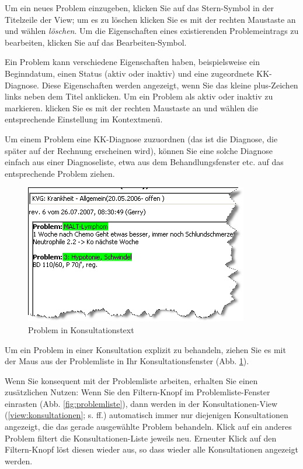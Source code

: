 Um ein neues Problem einzugeben, klicken Sie auf das Stern-Symbol in der Titelzeile der View; um es zu löschen klicken Sie es mit der rechten Maustaste an und wählen \textit{löschen}. Um die Eigenschaften eines existierenden Problemeintrags zu bearbeiten, klicken Sie auf das Bearbeiten-Symbol.

Ein Problem kann verschiedene Eigenschaften haben, beispielsweise ein Beginndatum, einen Status (aktiv oder inaktiv) und eine zugeordnete KK-Diagnose. Diese Eigenschaften werden angezeigt, wenn Sie das kleine plus-Zeichen links neben dem Titel anklicken. Um ein Problem als aktiv oder inaktiv zu markieren. klicken Sie es mit der rechten Maustaste an und wählen die entsprechende Einstellung im Kontextmenü.

Um einem Problem eine KK-Diagnose zuzuordnen (das ist die Diagnose, die später auf der Rechnung erscheinen wird), können Sie eine solche Diagnose einfach aus einer Diagnoseliste, etwa aus dem Behandlungsfenster etc. auf das entsprechende Problem ziehen.

\begin{figure}[ht]
    \includegraphics{images/problemliste2}
    \caption{Problem in Konsultationstext}
    \label{fig:problemliste2}
\end{figure}
Um ein Problem in einer Konsultation explizit zu behandeln, ziehen Sie es mit der Maus aus der Problemliste in Ihr Konsultationsfenster (Abb. \ref{fig:problemliste2}).

Wenn Sie konsequent mit der Problemliste arbeiten, erhalten Sie einen zusätzlichen Nutzen: Wenn Sie den Filtern-Knopf im Problemliste-Fenster einrasten (Abb. \ref{fig:problemliste}), dann werden in der Konsultationen-View (\ref{view:konsultationen}; s. \pageref{view:konsultationen} ff.) automatisch immer nur diejenigen Konsultationen angezeigt, die das gerade ausgewählte Problem behandeln.  Klick auf ein anderes Problem filtert die Konsultationen-Liste jeweils neu. Erneuter Klick auf den Filtern-Knopf löst diesen wieder aus, so dass wieder alle Konsultationen angezeigt werden.

